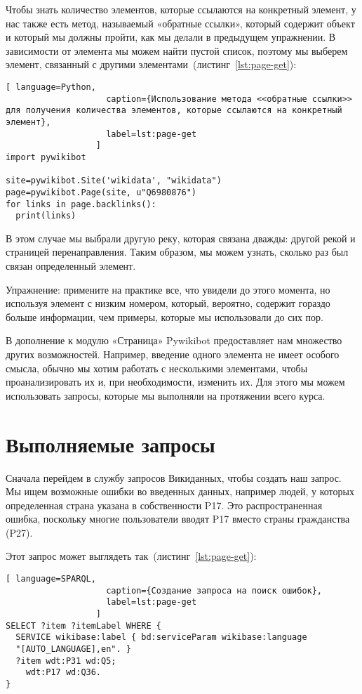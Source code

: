 Чтобы знать количество элементов, которые ссылаются на конкретный элемент, у нас также есть метод, называемый «обратные ссылки», который содержит объект и который мы должны пройти, как мы делали в предыдущем упражнении. В зависимости от элемента мы можем найти пустой список, поэтому мы выберем элемент, связанный с другими элементами~(листинг~\ref{lst:page-get}):

\begin{lstlisting}[ language=Python,
                    caption={Использование метода <<обратные ссылки>> для получения количества элементов, которые ссылаются на конкретный элемент},
                    label=lst:page-get
                  ]
import pywikibot

site=pywikibot.Site('wikidata', "wikidata")
page=pywikibot.Page(site, u"Q6980876")
for links in page.backlinks():
  print(links)
\end{lstlisting}

В этом случае мы выбрали другую реку, которая связана дважды: другой рекой и страницей перенаправления. Таким образом, мы можем узнать, сколько раз был связан определенный элемент.

Упражнение: примените на практике все, что увидели до этого момента, но используя элемент с низким номером, который, вероятно, содержит гораздо больше информации, чем примеры, которые мы использовали до сих пор.

В дополнение к модулю «Страница» Pywikibot предоставляет нам множество других возможностей. Например, введение одного элемента не имеет особого смысла, обычно мы хотим работать с несколькими элементами, чтобы проанализировать их и, при необходимости, изменить их. Для этого мы можем использовать запросы, которые мы выполняли на протяжении всего курса.

\section{Выполняемые запросы}
\label{sec:running queries}

Сначала перейдем в службу запросов Викиданных, чтобы создать наш запрос. Мы ищем возможные ошибки во введенных данных, например людей, у которых определенная страна указана в собственности P17. Это распространенная ошибка, поскольку многие пользователи вводят P17 вместо страны гражданства (P27).

Этот запрос может выглядеть так~(листинг~\ref{lst:page-get}):

\begin{lstlisting}[ language=SPARQL,
                    caption={Создание запроса на поиск ошибок},
                    label=lst:page-get
                  ]
SELECT ?item ?itemLabel WHERE {
  SERVICE wikibase:label { bd:serviceParam wikibase:language 
  "[AUTO_LANGUAGE],en". }
  ?item wdt:P31 wd:Q5;
    wdt:P17 wd:Q36.
}
\end{lstlisting}       

